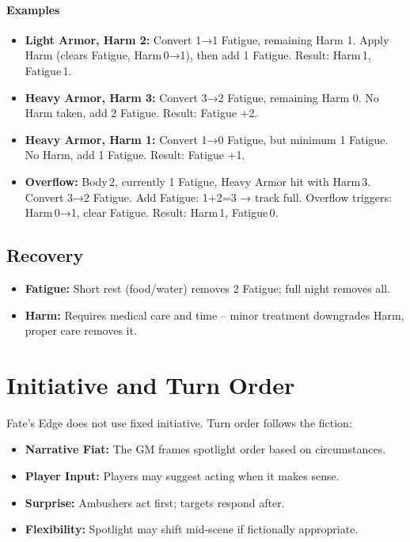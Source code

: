 \paragraph{Examples}
\begin{itemize}
  \item \textbf{Light Armor, Harm 2:} Convert 1→1 Fatigue, remaining Harm 1. Apply Harm (clears Fatigue, Harm 0→1), then add 1 Fatigue. Result: Harm 1, Fatigue 1.
  \item \textbf{Heavy Armor, Harm 3:} Convert 3→2 Fatigue, remaining Harm 0. No Harm taken, add 2 Fatigue. Result: Fatigue +2.
  \item \textbf{Heavy Armor, Harm 1:} Convert 1→0 Fatigue, but minimum 1 Fatigue. No Harm, add 1 Fatigue. Result: Fatigue +1.
  \item \textbf{Overflow:} Body 2, currently 1 Fatigue, Heavy Armor hit with Harm 3. Convert 3→2 Fatigue. Add Fatigue: 1+2=3 → track full. Overflow triggers: Harm 0→1, clear Fatigue. Result: Harm 1, Fatigue 0.
\end{itemize}

\subsection{Recovery}
\label{sec:harm-fatigue-recovery}
\begin{itemize}
  \item \textbf{Fatigue:} Short rest (food/water) removes 2 Fatigue; full night removes all.
  \item \textbf{Harm:} Requires medical care and time – minor treatment downgrades Harm, proper care removes it.
\end{itemize}

\section{Initiative and Turn Order}
\label{sec:initiative}

Fate's Edge does not use fixed initiative. Turn order follows the fiction:

\begin{itemize}
  \item \textbf{Narrative Fiat:} The GM frames spotlight order based on circumstances.
  \item \textbf{Player Input:} Players may suggest acting when it makes sense.
  \item \textbf{Surprise:} Ambushers act first; targets respond after.
  \item \textbf{Flexibility:} Spotlight may shift mid-scene if fictionally appropriate.
\end{itemize}

